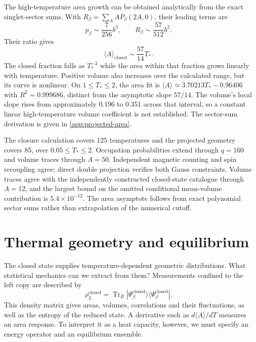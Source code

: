 \documentclass[twocolumn,draft,aps,nofootinbib,nobibnotes,final]{revtex4-2}
\begin{document}
The high-temperature area growth can be obtained analytically from the exact singlet-sector sums. With $R_\beta=\sum_A A P_\beta(2A,0)$, their leading terms are
\begin{equation}
 p_\beta\sim\frac{7}{256}b^3,\qquad
 R_\beta\sim\frac{57}{512}b^2.
\end{equation}
Their ratio gives
\begin{equation}\label{eqn:closed-area-temperature-law}
 \langle A\rangle_{\mathrm{closed}}
 \sim\frac{57}{14}T_*.
\end{equation}
The closed fraction falls as $T_*^{-3}$ while the area within that fraction grows linearly with temperature. Positive volume also increases over the calculated range, but its curve is nonlinear. On $1\le T_*\le2$, the area fit is $\langle A\rangle\simeq3.70213T_*-0.96406$ with $R^2=0.999686$, distinct from the asymptotic slope $57/14$. The volume's local slope rises from approximately 0.196 to 0.351 across that interval, so a constant linear high-temperature volume coefficient is not established. The sector-sum derivation is given in \autoref{app:projected-area}.

The closure calculation covers 125 temperatures and the projected geometry covers 85, over $0.05\le T_*\le2$. Occupation probabilities extend through $q=160$ and volume traces through $A=50$. Independent magnetic counting and spin recoupling agree; direct double projection verifies both Gauss constraints. Volume traces agree with the independently constructed closed-state catalogue through $A=12$, and the largest bound on the omitted conditional mean-volume contribution is $5.4\times10^{-12}$. The area asymptote follows from exact polynomial sector sums rather than extrapolation of the numerical cutoff.

\section{Thermal geometry and equilibrium}\label{sec:geometry-equilibrium}

The closed state supplies temperature-dependent geometric distributions. What statistical mechanics can we extract from them? Measurements confined to the left copy are described by
\begin{equation}
 \rho_L^{\mathrm{closed}}=\operatorname{Tr}_R
 |\Psi_\beta^{\mathrm{closed}}\rangle\langle\Psi_\beta^{\mathrm{closed}}|.
\end{equation}
This density matrix gives areas, volumes, correlations and their fluctuations, as well as the entropy of the reduced state. A derivative such as $d\langle A\rangle/dT$ measures an area response. To interpret it as a heat capacity, however, we must specify an energy operator and an equilibrium ensemble.
\end{document}
